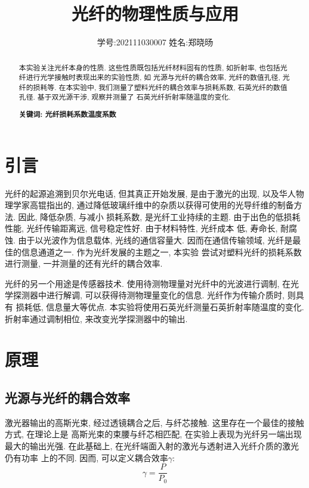 \documentclass[12pt,a4paper]{article}
\title{\vspace{-4cm}\Large 光纤的物理性质与应用}  %
\author{\kaishu 学号:202111030007 \hspace{2cm} 姓名:郑晓旸}   %
\date{}
\begin{document}
\maketitle

\begin{abstract}
    本实验关注光纤本身的性质. 这些性质既包括光纤材料固有的性质, 如折射率, 也包括光纤进行光学接触时表现出来的实验性质, 如
    光源与光纤的耦合效率, 光纤的数值孔径, 光纤的损耗等. 在本实验中, 我们测量了塑料光纤的耦合效率与损耗系数, 石英光纤的数值孔径. 基于双光源干涉, 观察并测量了
    石英光纤折射率随温度的变化. 

    \bf{关键词}: 光纤\quad 损耗系数\quad 温度系数
\end{abstract}

\section{引言}


光纤的起源追溯到贝尔光电话, 但其真正开始发展, 是由于激光的出现, 以及华人物理学家高锟指出的, 通过降低玻璃纤维中的杂质以获得可使用的光导纤维的制备方法. 因此, 降低杂质, 与减小
损耗系数, 是光纤工业持续的主题. 由于出色的低损耗性能, 光纤传输距离远, 信号稳定性好. 由于材料特性, 光纤成本
低, 寿命长, 耐腐蚀. 由于以光波作为信息载体, 光线的通信容量大. 因而在通信传输领域, 光纤是最佳的信息通道之一. 作为光纤发展的主题之一, 本实验
尝试对塑料光纤的损耗系数进行测量, 一并测量的还有光纤的耦合效率. 

光纤的另一个用途是传感器技术. 使用待测物理量对光纤中的光波进行调制, 在光学探测器中进行解调, 可以获得待测物理量变化的信息. 光纤作为传输介质时, 则具有
损耗低, 信息量大等优点. 本实验将使用石英光纤测量石英折射率随温度的变化. 折射率通过调制相位, 来改变光学探测器中的输出.


\section{原理}

\subsection{光源与光纤的耦合效率}
激光器输出的高斯光束, 经过透镜耦合之后, 与纤芯接触. 这里存在一个最佳的接触方式, 在理论上是
高斯光束的束腰与纤芯相匹配, 在实验上表现为光纤另一端出现最大的输出光强. 在此基础上, 在光纤端面入射的激光与透射进入光纤介质的激光仍有功率
上的不同. 因而, 可以定义耦合效率$\gamma$: 
\begin{equation}
    \gamma=\frac{P}{P_0}
\end{equation}
\end{document}
